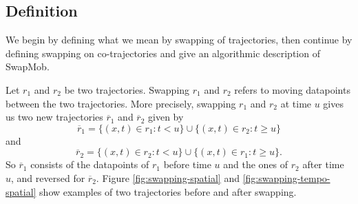 \documentclass[12pt]{article}
\newcommand{\loc}{x}
\newcommand{\tim}{t}
\newcommand{\traj}{r}
\newcommand{\swaptime}{u}
\theoremstyle{definition}
\begin{document}
\subsection{Definition}
We begin by defining what we mean by swapping of trajectories, then
continue by defining swapping on co-trajectories and give an
algorithmic description of SwapMob.

Let \(\traj_{1}\) and \(\traj_{2}\) be two trajectories. Swapping
\(\traj_{1}\) and \(\traj_{2}\) refers to moving datapoints between
the two trajectories. More precisely, swapping \(\traj_{1}\) and
\(\traj_{2}\) at time \(\swaptime\) gives us two new trajectories
\(\overline{\traj}_{1}\) and \(\overline{\traj}_{2}\) given by
\begin{equation*}
  \overline{\traj}_{1} = \{(\loc, \tim) \in \traj_{1}: \tim < \swaptime\}
  \cup \{(\loc, \tim) \in \traj_{2}: \tim \geq \swaptime\}
\end{equation*}
and
\begin{equation*}
  \overline{\traj}_{2} = \{(\loc, \tim) \in \traj_{2}: \tim < \swaptime\}
  \cup \{(\loc, \tim) \in \traj_{1}: \tim \geq \swaptime\}.
\end{equation*}
So \(\overline{\traj}_{1}\) consists of the datapoints of
\(\traj_{1}\) before time \(\swaptime\) and the ones of \(\traj_{2}\)
after time \(\swaptime\), and reversed for \(\overline{\traj}_{2}\).
Figure \ref{fig:swapping-spatial} and \ref{fig:swapping-tempo-spatial}
show examples of two trajectories before and after swapping.
\end{document}
